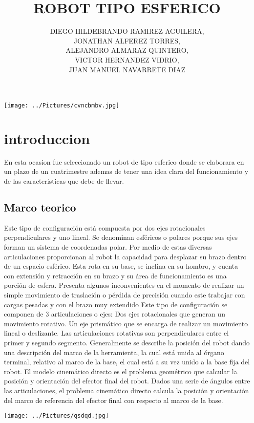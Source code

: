 \documentclass[12pt,a4paper]{article}
\author{DIEGO HILDEBRANDO RAMIREZ AGUILERA,\\JONATHAN ALFEREZ TORRES,\\ALEJANDRO ALMARAZ QUINTERO,\\VICTOR HERNANDEZ VIDRIO,\\JUAN MANUEL NAVARRETE DIAZ}
\title{ROBOT TIPO ESFERICO}
\begin{document}
\maketitle
\linebreak
\linebreak
\linebreak


\texttt{[image: ../Pictures/cvncbmbv.jpg]} 
\clearpage
\section{introduccion}
En esta ocasion fue seleccionado un robot de tipo esferico donde se elaborara en un plazo de un cuatrimestre ademas de tener una idea clara del funcionamiento y de las caracteristicas que debe de llevar.

\subsection{Marco teorico}
Este tipo de configuración está compuesta por dos ejes rotacionales perpendiculares y uno lineal. Se denominan esféricos o polares porque sus ejes forman un sistema de coordenadas polar. Por medio de estas diversas articulaciones proporcionan al robot la capacidad para desplazar su brazo dentro de un espacio esférico.
Esta rota en su base, se inclina en su hombro, y cuenta con extensión y retracción en su brazo y su área de funcionamiento es una porción de esfera. Presenta algunos inconvenientes en el momento de realizar un simple movimiento de traslación o pérdida de precisión cuando este trabajar con cargas pesadas y con el brazo muy extendido
Este tipo de configuración se componen de 3 articulaciones o ejes: Dos ejes rotacionales que generan un movimiento rotativo. Un eje prismático que se encarga de realizar un movimiento lineal o deslizante. Las articulaciones rotativas son perpendiculares entre el primer y segundo segmento.
Generalmente se describe la posición del robot dando una descripción del marco de la herramienta, la cual está unida al órgano terminal, relativo al marco de la base, el cual está a su vez unido a la base fija del robot. El modelo cinemático directo es el problema geométrico que calcular la posición y orientación del efector final del robot. Dados una serie de ángulos entre las articulaciones, el problema cinemático directo calcula la posición y orientación del marco de referencia del efector final con respecto al marco de la base. 

\texttt{[image: ../Pictures/qsdqd.jpg]} 
\end{document}

